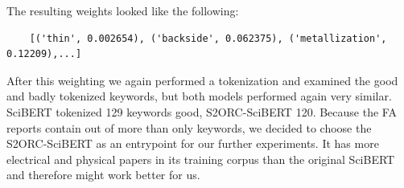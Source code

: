 The resulting weights looked like the following:
\begin{verbatim}
	[('thin', 0.002654), ('backside', 0.062375), ('metallization', 0.12209),...]
\end{verbatim}

After this weighting we again performed a tokenization and examined the good and badly tokenized keywords, but both models performed again very similar. SciBERT tokenized 129 keywords good, S2ORC-SciBERT 120. Because the FA reports contain out of more than only keywords, we decided to choose the S2ORC-SciBERT as an entrypoint for our further experiments. It has more electrical and physical papers in its training corpus than the original SciBERT and therefore might work better for us.
